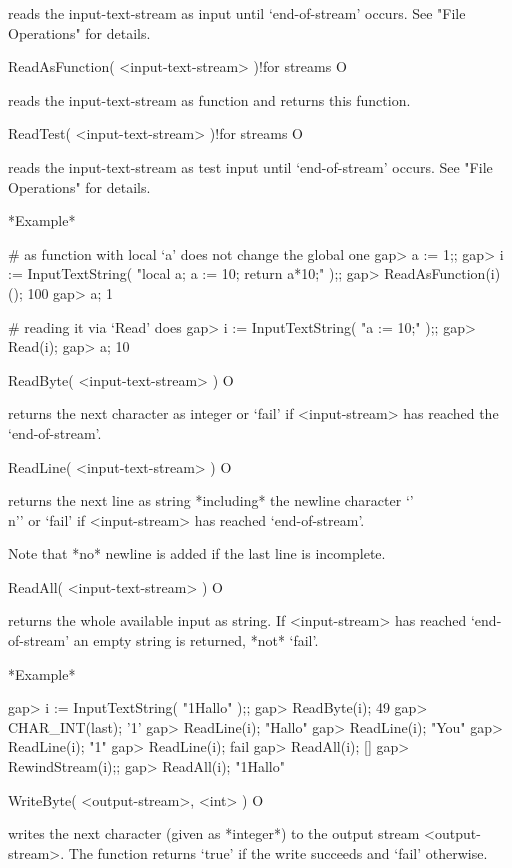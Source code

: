 reads the input-text-stream as  input  until `end-of-stream' occurs.  See
"File Operations" for details.

\>ReadAsFunction( <input-text-stream> )!{for streams} O

reads the input-text-stream as function and returns this function.

\>ReadTest( <input-text-stream> )!{for streams} O

reads the input-text-stream as  test input until `end-of-stream' occurs.
See "File Operations" for details.

*Example*

\beginexample
# as function with local `a' does not change the global one
gap> a := 1;;
gap> i := InputTextString( "local a; a := 10; return a*10;" );;
gap> ReadAsFunction(i)();
100
gap> a;
1

# reading it via `Read' does
gap> i := InputTextString( "a := 10;" );;                      
gap> Read(i);
gap> a;
10
\endexample

\>ReadByte( <input-text-stream> ) O

returns the  next character as  integer  or `fail'  if <input-stream> has
reached the `end-of-stream'.

\>ReadLine( <input-text-stream> ) O

returns  the   next line as   string  *including*  the  newline character
`{'\\n'}' or `fail' if <input-stream> has reached `end-of-stream'.

Note that *no* newline is added if the last line is incomplete.

\>ReadAll( <input-text-stream> ) O

returns   the  whole available input as    string.  If <input-stream> has
reached `end-of-stream' an empty string is returned, *not* `fail'.

*Example*

\beginexample
gap> i := InputTextString( "1Hallo\nYou{}" );;
gap> ReadByte(i);
49
gap> CHAR_INT(last);
'1'
gap> ReadLine(i);
"Hallo\n"
gap> ReadLine(i);
"You\n"
gap> ReadLine(i);
"1"
gap> ReadLine(i);
fail
gap> ReadAll(i);
[]
gap> RewindStream(i);;
gap> ReadAll(i);     
"1Hallo\nYou{}"
\endexample


\>WriteByte( <output-stream>, <int> ) O

writes the  next  character  (given  as *integer*)  to the  output stream
<output-stream>.  The function  returns `true' if  the write succeeds and
`fail' otherwise.


